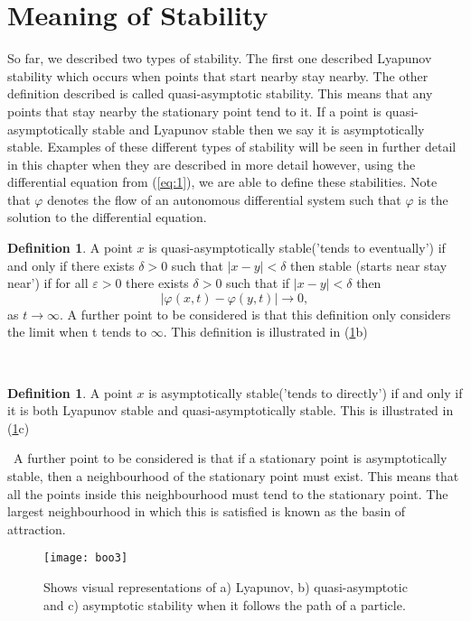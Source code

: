 \documentclass[a4paper]{report}
\theoremstyle{definition}
\newtheorem{defn}[thm]{Definition}
\begin{document}
\section{Meaning of Stability}
So far, we described two types of stability. The first one described Lyapunov stability which occurs when points that start nearby stay nearby. The other definition described is called quasi-asymptotic stability. This means that any points that stay nearby the stationary point tend to it. If a point is quasi-asymptotically stable and Lyapunov stable then we say it is asymptotically stable.  Examples of these different types of stability will be seen in further detail in this chapter when they are described in more detail however, using the differential equation from (\ref{eq:1}), we are able to define these stabilities. Note that $\varphi$ denotes the flow of an autonomous differential system such that $\varphi$ is the solution to the differential equation.
\\
\begin{mdframed}[backgroundcolor=airforceblue!25] 
\begin{defn}\label{def:3}
A point $x$ is quasi-asymptotically stable('tends to eventually') if and only if there exists $\delta>0$ such that  $\left| x-y\right| <\delta$ then  stable (starts near stay near') if for all $\varepsilon>0$ there exists $\delta>0$ such that if $\left| x-y\right| <\delta$ then
\begin{equation}
|\varphi( x,t)-\varphi( y,t)| \rightarrow{0}, 
\end{equation}
as $t\rightarrow\infty$. A further point to be considered is that this definition only considers the limit when t tends to $\infty$.
This definition is illustrated in (\ref{figure1}b)
\end{defn}
\end{mdframed}\


\begin{mdframed}[backgroundcolor=airforceblue!25]  
\begin{defn}\label{def:4}
A point $x$ is asymptotically stable('tends to directly') if and only if it is both Lyapunov stable and quasi-asymptotically stable.
This is illustrated in (\ref{figure1}c)
\end{defn}
\end{mdframed}\
A further point to be considered is that if a stationary point is asymptotically stable, then a neighbourhood of the stationary point must exist. This means that all the points inside this neighbourhood must tend to the stationary point. The largest neighbourhood in which this is satisfied is known as the basin of attraction.
\begin{figure}[H]
 \texttt{[image: boo3]}
  \caption{Shows visual representations of a) Lyapunov, b) quasi-asymptotic and c) asymptotic stability when it follows the path of a particle. }
  \label{figure1}
\end{figure}
\end{document}
